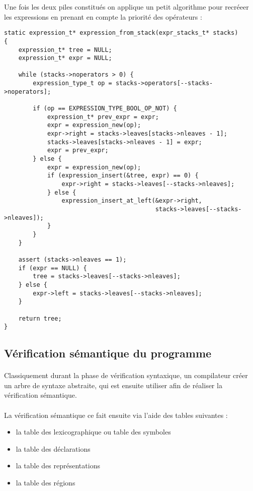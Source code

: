 Une fois les deux piles constitués on applique un petit algorithme pour recréeer
les expressions en prenant en compte la priorité des opérateurs :
\begin{verbatim}
static expression_t* expression_from_stack(expr_stacks_t* stacks)
{
    expression_t* tree = NULL;
    expression_t* expr = NULL;

    while (stacks->noperators > 0) {
        expression_type_t op = stacks->operators[--stacks->noperators];

        if (op == EXPRESSION_TYPE_BOOL_OP_NOT) {
            expression_t* prev_expr = expr;
            expr = expression_new(op);
            expr->right = stacks->leaves[stacks->nleaves - 1];
            stacks->leaves[stacks->nleaves - 1] = expr;
            expr = prev_expr;
        } else {
            expr = expression_new(op);
            if (expression_insert(&tree, expr) == 0) {
                expr->right = stacks->leaves[--stacks->nleaves];
            } else {
                expression_insert_at_left(&expr->right,
                                          stacks->leaves[--stacks->nleaves]);
            }
        }
    }

    assert (stacks->nleaves == 1);
    if (expr == NULL) {
        tree = stacks->leaves[--stacks->nleaves];
    } else {
        expr->left = stacks->leaves[--stacks->nleaves];
    }

    return tree;
}
\end{verbatim}

\subsection{Vérification sémantique du programme}

\paragraph{}Classiquement durant la phase de vérification syntaxique, un 
compilateur créer un arbre de syntaxe abstraite, qui est ensuite utiliser afin 
de réaliser la vérification sémantique.

\paragraph{}La vérification sémantique ce fait ensuite via l'aide des tables 
suivantes :

\begin{itemize}
 \item la table des lexicographique ou table des symboles
 \item la table des déclarations
 \item la table des représentations
 \item la table des régions
\end{itemize}

